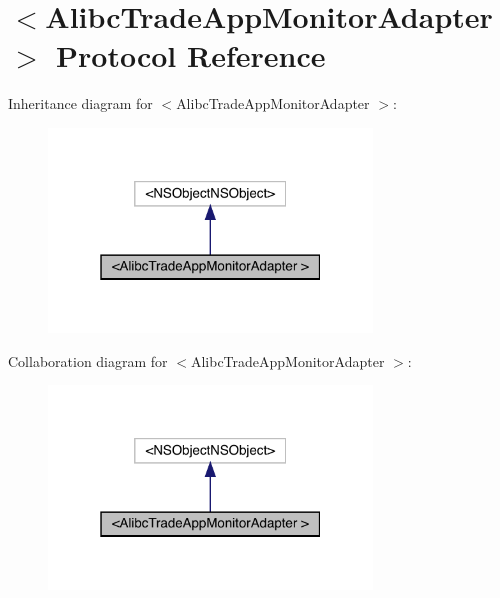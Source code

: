 \hypertarget{protocol_alibc_trade_app_monitor_adapter_01-p}{}\section{$<$Alibc\+Trade\+App\+Monitor\+Adapter $>$ Protocol Reference}
\label{protocol_alibc_trade_app_monitor_adapter_01-p}


Inheritance diagram for $<$Alibc\+Trade\+App\+Monitor\+Adapter $>$\+:\nopagebreak
\begin{figure}[H]
\begin{center}
\leavevmode
\includegraphics[width=244pt]{protocol_alibc_trade_app_monitor_adapter_01-p__inherit__graph}
\end{center}
\end{figure}


Collaboration diagram for $<$Alibc\+Trade\+App\+Monitor\+Adapter $>$\+:\nopagebreak
\begin{figure}[H]
\begin{center}
\leavevmode
\includegraphics[width=244pt]{protocol_alibc_trade_app_monitor_adapter_01-p__coll__graph}
\end{center}
\end{figure}

